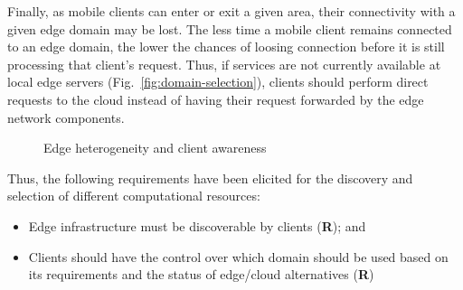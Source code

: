 Finally, as mobile clients can enter or exit a given area, their connectivity with a given edge domain may be lost. The less time a mobile client remains connected to an edge domain, the lower the chances of loosing connection before it is still processing that client's request. Thus, if services are not currently available at local edge servers (Fig.~\ref{fig:domain-selection}), clients should perform direct requests to the cloud instead of having their request forwarded by the edge network components. 

\begin{figure}[tbp]
	\centering
	\captionsetup[subfigure]{width=0.5\textwidth}	
	\null\hfill
	\captionsetup[subfigure]{width=0.45\textwidth}	
	\hfill
	\hfill\null
	\caption{Edge heterogeneity and client awareness}\label{fig:1}
\end{figure}

Thus, the following requirements have been elicited for the discovery and selection of different computational resources:


\begin{itemize}

	\item Edge infrastructure must be discoverable by clients (\textbf{R}); and

	\item Clients should have the control over which domain should be used based on its requirements and the status of edge/cloud alternatives (\textbf{R})

\end{itemize}

